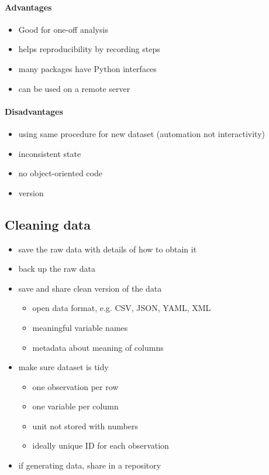 \documentclass{article}
\begin{document}
\paragraph{Advantages}

\begin{itemize}
	\item Good for one-off analysis
	\item helps reproducibility by recording steps
	\item many packages have Python interfaces
	\item can be used on a remote server
\end{itemize}

\paragraph{Disadvantages}

\begin{itemize}
	\item using same procedure for new dataset (automation not interactivity)
	\item inconsistent state
	\item no object-oriented code
	\item version
\end{itemize}

\subsection{Cleaning data}

\begin{itemize}
	\item save the raw data with details of how to obtain it
	\item back up the raw data
	\item save and share clean version of the data \begin{itemize}
		      \item open data format, e.g. CSV, JSON, YAML, XML
		      \item meaningful variable names
		      \item metadata about meaning of columns
	      \end{itemize}
	\item make sure dataset is tidy \begin{itemize}
		      \item one observation per row
		      \item one variable per column
		      \item unit not stored with numbers
		      \item ideally unique ID for each observation
	      \end{itemize}
	\item if generating data, share in a repository
\end{itemize}
\end{document}
